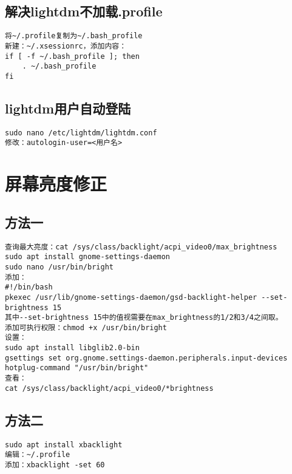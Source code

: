 \documentclass[a4paper,fontset=fandol,zihao=-4,linespread=1.2,oneside]{ctexbook}
\begin{document}
\subsection{解决lightdm不加载.profile}
\begin{lstlisting}
将~/.profile复制为~/.bash_profile
新建：~/.xsessionrc，添加内容：
if [ -f ~/.bash_profile ]; then
    . ~/.bash_profile
fi
\end{lstlisting}

\subsection{lightdm用户自动登陆}
\begin{lstlisting}
sudo nano /etc/lightdm/lightdm.conf
修改：autologin-user=<用户名>
\end{lstlisting}

\section{屏幕亮度修正}
\subsection{方法一}
\begin{lstlisting}
查询最大亮度：cat /sys/class/backlight/acpi_video0/max_brightness
sudo apt install gnome-settings-daemon
sudo nano /usr/bin/bright
添加：
#!/bin/bash
pkexec /usr/lib/gnome-settings-daemon/gsd-backlight-helper --set-brightness 15
其中--set-brightness 15中的值视需要在max_brightness的1/2和3/4之间取。
添加可执行权限：chmod +x /usr/bin/bright
设置：
sudo apt install libglib2.0-bin
gsettings set org.gnome.settings-daemon.peripherals.input-devices hotplug-command "/usr/bin/bright"
查看：
cat /sys/class/backlight/acpi_video0/*brightness
\end{lstlisting}

\subsection{方法二}
\begin{lstlisting}
sudo apt install xbacklight
编辑：~/.profile
添加：xbacklight -set 60
\end{lstlisting}
\end{document}
